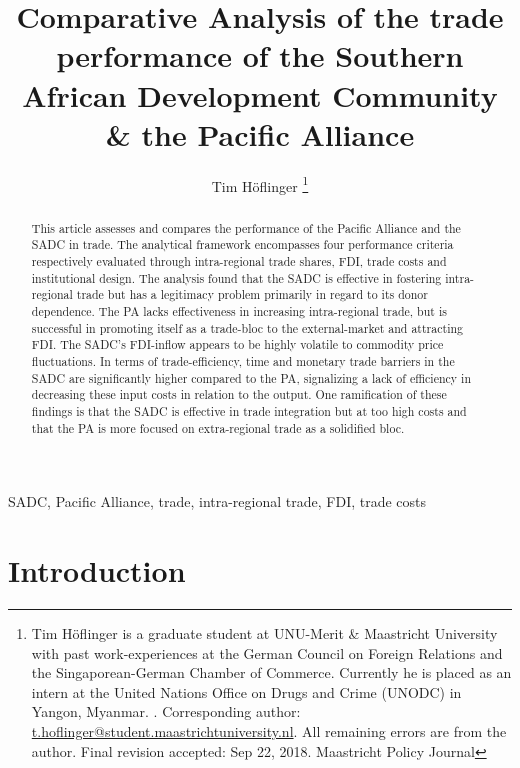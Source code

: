 \title{Comparative Analysis of the trade performance of the Southern African Development Community \& the Pacific Alliance}
\author{Tim Höflinger
\thanks{Tim Höflinger is a graduate student at UNU-Merit \& Maastricht University with past work-experiences at the German Council on Foreign Relations and the Singaporean-German Chamber of Commerce. Currently he is placed as an intern at the United Nations Office on Drugs and Crime (UNODC) in Yangon, Myanmar. . Corresponding author: \href{mailto:t.hoflinger@student.maastrichtuniversity.nl}{t.hoflinger@student.maastrichtuniversity.nl}. All remaining
	errors are from the author. Final revision accepted: Sep 22, 2018. \footnotesize{Maastricht Policy Journal\textsuperscript{\textcopyright}} }  
}


\maketitle

\begin{abstract}
   This article assesses and compares the performance of the Pacific Alliance and the SADC in trade. The analytical framework encompasses four performance criteria respectively evaluated through intra-regional trade shares, FDI, trade costs and institutional design. The analysis found that the SADC is effective in fostering intra-regional trade but has a legitimacy problem primarily in regard to its donor dependence. The PA lacks effectiveness in increasing intra-regional trade, but is successful in promoting itself as a trade-bloc to the external-market and attracting FDI. The SADC’s FDI-inflow appears to be highly volatile to commodity price fluctuations. In terms of trade-efficiency, time and monetary trade barriers in the SADC are significantly higher compared to the PA, signalizing a lack of efficiency in decreasing these input costs in relation to the output. One ramification of these findings is that the SADC is effective in trade integration but at too high costs and that the PA is more focused on extra-regional trade as a solidified bloc.
\end{abstract}
\begin{keywords}
    SADC, Pacific Alliance, trade, intra-regional trade, FDI, trade costs
\end{keywords}

\section{Introduction}

